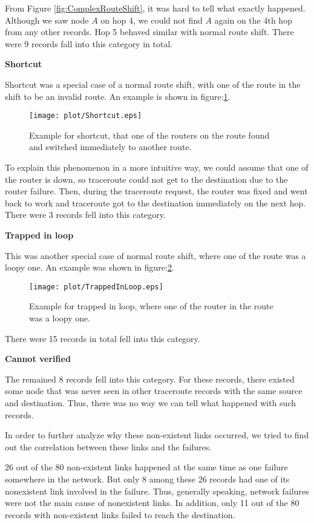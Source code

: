 \documentclass[conference, twocolumn, oneside, 10pt]{IEEEtran}
\begin{document}
From Figure \ref{fig:ComplexRouteShift}, it was hard to tell what exactly happened. Although we saw node $A$ on hop 4, we could not find $A$ again on the 4th hop from any other records. Hop 5 behaved similar with normal route shift. There were 9 records fall into this category in total.

\textbf{Shortcut}

Shortcut was a special case of a normal route shift, with one of the route in the shift to be an invalid route. An example is shown in figure:\ref{fig:Shortcut}.

\begin{figure}[h!]
  \centering
  \texttt{[image: plot/Shortcut.eps]}
  \caption{Example for shortcut, that one of the routers on the route found and switched immediately to another route.}
  \label{fig:Shortcut}
\end{figure}

To explain this phenomenon in a more intuitive way, we could assume that one of the router is down, so traceroute could not get to the destination due to the router failure. Then, during the traceroute request, the router was fixed and went back to work and traceroute got to the destination immediately on the next hop. There were 3 records fell into this category.

\textbf{Trapped in loop}

This was another special case of normal route shift, where one of the route was a loopy one. An example was shown in figure:\ref{fig:TrappedInLoop}.

\begin{figure}[h!]
  \centering
  \texttt{[image: plot/TrappedInLoop.eps]}
  \caption{Example for trapped in loop, where one of the router in the route was a loopy one.}
  \label{fig:TrappedInLoop}
\end{figure}

There were 15 records in total fell into this category.

\textbf{Cannot verified}

The remained 8 records fell into this category. For these records, there existed some node that was never seen in other traceroute records with the same source and destination. Thus, there was no way we can tell what happened with such records.

In order to further analyze why these non-existent links occurred, we tried to find out the correlation between these links and the failures.

26 out of the 80 non-existent links happened at the same time as one failure somewhere in the network. But only 8 among these 26 records had one of its nonexistent link involved in the failure. Thus, generally speaking, network failures were not the main cause of nonexistent links. In addition, only 11 out of the 80 records with non-existent links failed to reach the destination.
\end{document}

